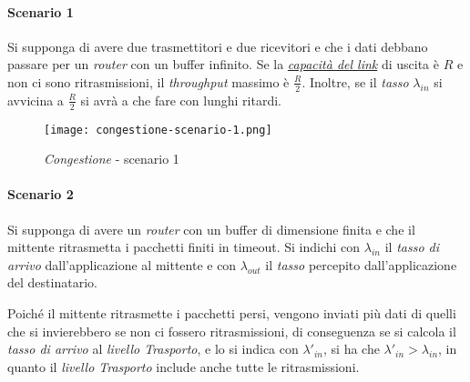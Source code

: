\paragraph{Scenario 1}
Si supponga di avere due trasmettitori e due ricevitori e che i dati debbano
passare per un \emph{router} con un buffer infinito. Se la \hyperlink{sym:2}
{\emph{capacità del link}} di uscita è $R$ e non ci sono ritrasmissioni, il
\emph{throughput} massimo è $\frac{R}{2}$. Inoltre, se il \emph{tasso}
$\lambda_{in}$ si avvicina a $\frac{R}{2}$ si avrà a che fare con lunghi ritardi.

\begin{figure}[h!]
    \centering
    \texttt{[image: congestione-scenario-1.png]}
    \caption{\emph{Congestione} - scenario 1}
\end{figure}

\paragraph{Scenario 2}
Si supponga di avere un \emph{router} con un buffer di dimensione finita e che il
mittente ritrasmetta i pacchetti finiti in timeout. Si indichi con $\lambda_{in}$
il \emph{tasso di arrivo} dall'applicazione al mittente e con $\lambda_{out}$
il \emph{tasso} percepito dall'applicazione del destinatario.

Poiché il mittente ritrasmette i pacchetti persi, vengono inviati più dati di
quelli che si invierebbero se non ci fossero ritrasmissioni, di conseguenza se si
calcola il \emph{tasso di arrivo} al \emph{livello Trasporto}, e lo si indica con
$\lambda'_{in}$, si ha che $\lambda'_{in}>\lambda_{in}$, in quanto il \emph{livello
Trasporto} include anche tutte le ritrasmissioni.


